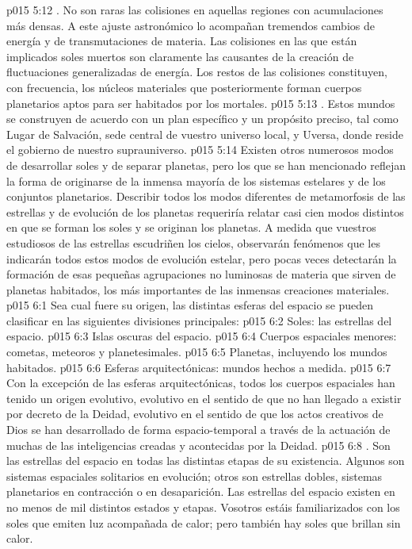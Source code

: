 \vs p015 5:12 . No son raras las colisiones en aquellas regiones con acumulaciones más densas. A este ajuste astronómico lo acompañan tremendos cambios de energía y de transmutaciones de materia. Las colisiones en las que están implicados soles muertos son claramente las causantes de la creación de fluctuaciones generalizadas de energía. Los restos de las colisiones constituyen, con frecuencia, los núcleos materiales que posteriormente forman cuerpos planetarios aptos para ser habitados por los mortales.
\vs p015 5:13 . Estos mundos se construyen de acuerdo con un plan específico y un propósito preciso, tal como Lugar de Salvación, sede central de vuestro universo local, y Uversa, donde reside el gobierno de nuestro suprauniverso.
\vs p015 5:14 \pc Existen otros numerosos modos de desarrollar soles y de separar planetas, pero los que se han mencionado reflejan la forma de originarse de la inmensa mayoría de los sistemas estelares y de los conjuntos planetarios. Describir todos los modos diferentes de metamorfosis de las estrellas y de evolución de los planetas requeriría relatar casi cien modos distintos en que se forman los soles y se originan los planetas. A medida que vuestros estudiosos de las estrellas escudriñen los cielos, observarán fenómenos que les indicarán todos estos modos de evolución estelar, pero pocas veces detectarán la formación de esas pequeñas agrupaciones no luminosas de materia que sirven de planetas habitados, los más importantes de las inmensas creaciones materiales.
\vs p015 6:1 Sea cual fuere su origen, las distintas esferas del espacio se pueden clasificar en las siguientes divisiones principales:
\vs p015 6:2 Soles: las estrellas del espacio.
\vs p015 6:3 Islas oscuras del espacio.
\vs p015 6:4 Cuerpos espaciales menores: cometas, meteoros y planetesimales.
\vs p015 6:5 Planetas, incluyendo los mundos habitados.
\vs p015 6:6 Esferas arquitectónicas: mundos hechos a medida.
\vs p015 6:7 \pc Con la excepción de las esferas arquitectónicas, todos los cuerpos espaciales han tenido un origen evolutivo, evolutivo en el sentido de que no han llegado a existir por decreto de la Deidad, evolutivo en el sentido de que los actos creativos de Dios se han desarrollado de forma espacio\hyp{}temporal a través de la actuación de muchas de las inteligencias creadas y acontecidas por la Deidad.
\vs p015 6:8 \pc {}. Son las estrellas del espacio en todas las distintas etapas de su existencia. Algunos son sistemas espaciales solitarios en evolución; otros son estrellas dobles, sistemas planetarios en contracción o en desaparición. Las estrellas del espacio existen en no menos de mil distintos estados y etapas. Vosotros estáis familiarizados con los soles que emiten luz acompañada de calor; pero también hay soles que brillan sin calor.
